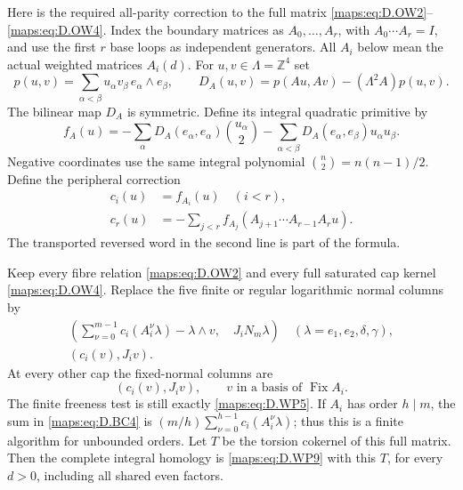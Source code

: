 \begin{theorem}
Here is the required all-parity correction to the
full matrix \eqref{maps:eq:D.OW2}--\eqref{maps:eq:D.OW4}. Index the boundary
matrices as $A_0,\ldots,A_r$, with
$A_0\cdots A_r=I$, and use the first $r$ base loops
as independent generators. All $A_i$ below mean
the actual weighted matrices $A_i(d)$.
For $u,v\in\Lambda=\mathbb Z^4$ set
\[
 p(u,v)=\sum_{\alpha<\beta}u_\alpha v_\beta\,
                  e_\alpha\wedge e_\beta,\qquad
 D_A(u,v)=p(Au,Av)-(\Lambda^2A)p(u,v).
                                                        \tag{D.BC1}\label{maps:eq:D.BC1}
\]
The bilinear map $D_A$ is symmetric. Define its
integral quadratic primitive by
\[
 f_A(u)=-\sum_\alpha D_A(e_\alpha,e_\alpha)
                       \binom{u_\alpha}{2}
        -\sum_{\alpha<\beta}D_A(e_\alpha,e_\beta)
                       u_\alpha u_\beta .
                                                        \tag{D.BC2}\label{maps:eq:D.BC2}
\]
Negative coordinates use the same integral polynomial
$\binom n2=n(n-1)/2$.
Define the peripheral correction
\[
 \begin{split}
 c_i(u)&=f_{A_i}(u) \quad (i<r),\\
 c_r(u)&=-\sum_{j<r}
       f_{A_j}(A_{j+1}\cdots A_{r-1}A_r u).
 \end{split}                                            \tag{D.BC3}\label{maps:eq:D.BC3}
\]
The transported reversed word in the second line
is part of the formula.

Keep every fibre relation \eqref{maps:eq:D.OW2} and every full
saturated cap kernel \eqref{maps:eq:D.OW4}. Replace the five
finite or regular logarithmic normal columns by
\[
 \begin{gathered}
 \left(\sum_{\nu=0}^{m-1}c_i(A_i^\nu\lambda)
                  -\lambda\wedge v,\quad J_iN_m\lambda\right)
       \quad(\lambda=e_1,e_2,\delta,\gamma),\\
                       (c_i(v),J_iv).
 \end{gathered}                                          \tag{D.BC4}\label{maps:eq:D.BC4}
\]
At every other cap the fixed-normal columns are
\[
                         (c_i(v),J_iv),
                         \qquad v\text{ in a basis of }\operatorname{Fix} A_i.
                                                        \tag{D.BC5}\label{maps:eq:D.BC5}
\]
The finite freeness test is still exactly \eqref{maps:eq:D.WP5}.
If $A_i$ has order $h\mid m$, the sum in \eqref{maps:eq:D.BC4}
is $(m/h)\sum_{\nu=0}^{h-1}c_i(A_i^\nu\lambda)$;
thus this is a finite algorithm for unbounded orders.
Let $T$ be the torsion cokernel of this full matrix.
Then the complete integral homology is \eqref{maps:eq:D.WP9}
with this $T$, for every $d>0$, including all
shared even factors.

\end{theorem}


